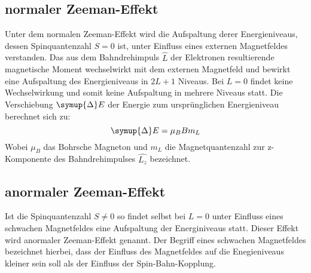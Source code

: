 \subsection{normaler Zeeman-Effekt}
\label{sec:nzeeman}

Unter dem normalen Zeeman-Effekt wird die Aufspaltung derer Energieniveaus, dessen Spinquantenzahl $S = 0$ ist, unter Einfluss eines externen Magnetfeldes verstanden.
Das aus dem Bahndrehimpuls $\hat{L}$ der Elektronen resultierende magnetische Moment wechselwirkt mit dem externen Magnetfeld und bewirkt eine Aufspaltung des Energieniveaus 
in $2L+1$ Niveaus.  Bei $L = 0$ findet keine Wechselwirkung und somit keine Aufspaltung in mehrere Niveaus statt.
Die Verschiebung $\symup{\Delta} E$ der Energie zum ursprünglichen Energieniveau berechnet sich zu:
\begin{equation}
\symup{\Delta} E = \mu_B B m_L
\label{eq:nzeeman}
\end{equation}
Wobei $\mu_B$ das Bohrsche Magneton und $m_L$ die Magnetquantenzahl zur z-Komponente des Bahndrehimpulses $\hat{L_z}$ bezeichnet.\\








\subsection{anormaler Zeeman-Effekt}
\label{sec:anzeeman}

Ist die Spinquantenzahl $S \neq 0$ so findet selbst bei $L = 0$ unter Einfluss eines schwachen Magnetfeldes eine Aufspaltung der Energiniveaus statt.
Dieser Effekt wird anormaler Zeeman-Effekt genannt.
Der Begriff eines schwachen Magnetfeldes bezeichnet hierbei, dass der Einfluss des Magnetfeldes auf die Enegieniveaus kleiner sein soll als der Einfluss der Spin-Bahn-Kopplung.


